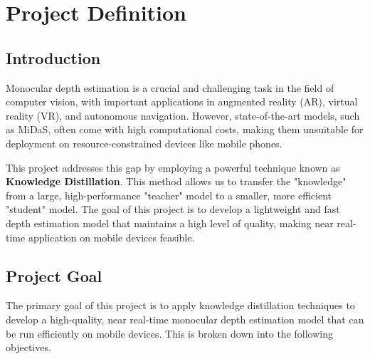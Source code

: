 \chapter{Project Definition}
\label{chap:project_definition}



\section{Introduction}
\label{sec:intro}

Monocular depth estimation is a crucial and challenging task in the field of computer vision, with important applications in augmented reality (AR), virtual reality (VR), and autonomous navigation. However, state-of-the-art models, such as MiDaS, often come with high computational costs, making them unsuitable for deployment on resource-constrained devices like mobile phones.

This project addresses this gap by employing a powerful technique known as \textbf{Knowledge Distillation}. This method allows us to transfer the "knowledge" from a large, high-performance "teacher" model to a smaller, more efficient "student" model. The goal of this project is to develop a lightweight and fast depth estimation model that maintains a high level of quality, making near real-time application on mobile devices feasible.

\section{Project Goal}
\label{sec:project_goal}

The primary goal of this project is to apply knowledge distillation techniques to develop a high-quality, near real-time monocular depth estimation model that can be run efficiently on mobile devices. This is broken down into the following objectives.


